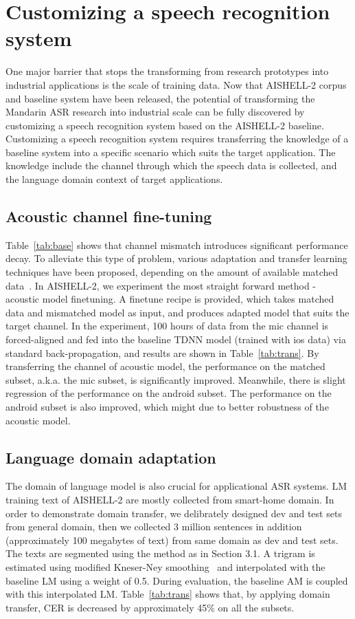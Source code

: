 \documentclass[a4paper]{article}
\begin{document}
\section{Customizing a speech recognition system}

One major barrier that stops the transforming from research prototypes into
industrial applications is the scale of training data. Now that AISHELL-2 corpus
and baseline system have been released, the potential of transforming the
Mandarin ASR research into industrial scale can be fully discovered by
customizing a speech recognition system based on the AISHELL-2
baseline. Customizing a speech recognition system requires transferring the
knowledge of a baseline system into a specific scenario which suits the target
application. The knowledge include the channel through which the speech data is
collected, and the language domain context of target applications.

\subsection{Acoustic channel fine-tuning}

Table~\ref{tab:base} shows that channel mismatch introduces significant
performance decay. To alleviate this type of problem, various adaptation and
transfer learning techniques have been proposed, depending on the amount of
available matched data~\cite{adapt}. In AISHELL-2, we experiment the most
straight forward method - acoustic model finetuning. A finetune recipe is
provided, which takes matched data and mismatched model as input, and produces
adapted model that suits the target channel. In the experiment, 100 hours of
data from the mic channel is forced-aligned and fed into the baseline TDNN model
(trained with ios data) via standard back-propagation, and results are shown in
Table~\ref{tab:trans}. By transferring the channel of acoustic model, the
performance on the matched subset, a.k.a. the mic subset, is significantly
improved. Meanwhile, there is slight regression of the performance on the
android subset. The performance on the android subset is also improved, which
might due to better robustness of the acoustic model.

\subsection{Language domain adaptation}

The domain of language model is also crucial for applicational ASR
systems. LM training text of AISHELL-2 are mostly collected from smart-home
domain. In order to demonstrate domain transfer, we delibrately designed dev and
test sets from general domain, then we collected 3 million sentences in addition
(approximately 100 megabytes of text) from same domain as dev and test sets. The
texts are segmented using the method as in Section 3.1. A trigram is estimated
using modified Kneser-Ney smoothing~\cite{kn} and interpolated with the
baseline LM using a weight of 0.5. During evaluation, the baseline AM is coupled
with this interpolated LM. Table~\ref{tab:trans} shows that, by applying domain
transfer, CER is decreased by approximately 45\% on all the subsets.
\end{document}
